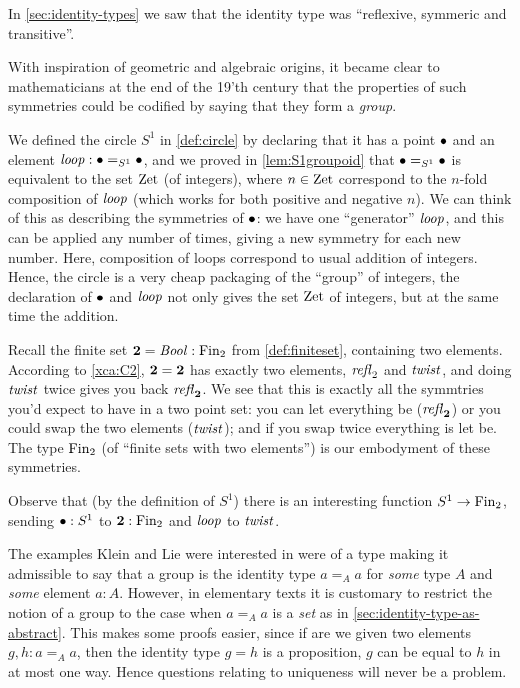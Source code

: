 In \cref{sec:identity-types} we saw that the identity type was ``reflexive, symmeric and transitive''.

With inspiration of geometric and algebraic origins, it became clear to mathematicians at the end of the 19'th century that the properties of such symmetries could be codified by saying that they form a \emph{group}.

\begin{example}\label{ex:base=base}
  We defined the circle $S^1$ in \cref{def:circle} by declaring that it has a point $\bullet$ and an element $\mathit{loop}:\bullet=_{S^1}\bullet$, and we proved in \cref{lem:S1groupoid} that $\bullet=_{S^1}\bullet$ is equivalent to the set $\mathrm{Zet}$ (of integers), where $n\in\mathrm{Zet}$ correspond to the $n$-fold composition of $\mathit{loop}$ (which works for both positive and negative $n$).  We can think of this as describing the symmetries of $\bullet$: we have one ``generator'' $\mathit{loop}$, and this can be applied any number of times, giving a new symmetry for each new number.  Here, composition of loops correspond to usual addition of integers.  Hence, the circle is a very cheap packaging of the ``{group}'' of integers, the declaration of $\bullet$ and $\mathit{loop}$ not only gives the set $\mathrm{Zet}$ of integers, but at the same time the addition.
\end{example}
\begin{example}
  Recall the finite set $\mathbf{2} =\mathop{\mathit{Bool}}:\operatorname{Fin}_2$ from \cref{def:finiteset}, containing two elements.   According to \cref{xca:C2}, $\mathbf{2} =\mathbf{2} $ has exactly two elements, $\mathop{{\it refl}_{\mathrm 2}}$ and $\mathit{twist}$, and doing $\mathit{twist}$ twice gives you back $\mathop{{\it refl}_{\mathbf{2} }}$.  We see that this is exactly all the symmtries you'd expect to have in a two point set: you can let everything be ($\mathop{{\it refl}_{\mathbf{2} }}$) or you could swap the two elements ($\mathit{twist}$); and if you swap twice everything is let be.  The type $\operatorname{Fin}_2$ (of ``finite sets with two elements'') is our embodyment of these symmetries.  

Observe that (by the definition of $S^1$) there is an interesting function $S^1\to\operatorname{Fin}_2$, sending $\bullet:S^1$ to $\mathbf{2} :\operatorname{Fin}_2$ and $\mathit{loop}$ to $\mathit{twist}$.
\end{example}


The examples Klein and Lie were interested in were of a type making it admissible to say that a group is the identity type $a=_Aa$ for \emph{some} type $A$ and \emph{some} element $a:A$.
However, in elementary texts it is customary to restrict the notion of a group to the case when $a=_Aa$ is a \emph{set} as in \cref{sec:identity-type-as-abstract}.  This makes some proofs easier, since if are we given two elements $g,h:a=_Aa$, then the identity type $g=h$ is a proposition, \ie $g$ can be equal to $h$ in at most one way.  Hence questions relating to uniqueness will never be a problem.



